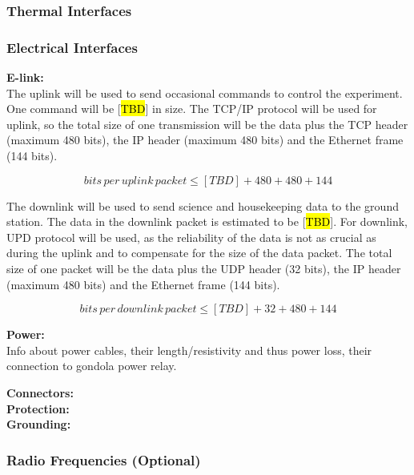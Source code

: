 % 


\subsubsection{Thermal Interfaces}
\label{sec:4.2.2}


\subsubsection{Electrical Interfaces}
\label{sec:4.2.3}
\textbf{E-link:}\\
The uplink will be used to send occasional commands to control the experiment. One command will be [\hl{TBD}] in size. The TCP/IP protocol will be used for uplink, so the total size of one transmission will be the data plus the TCP header (maximum 480 bits), the IP header (maximum 480 bits) and the Ethernet frame (144 bits). 

$$ bits\, per\, uplink\, packet \leq [TBD] + 480 + 480 + 144 $$

The downlink will be used to send science and housekeeping data to the ground station. The data in the downlink packet is estimated to be [\hl{TBD}]. For downlink, UPD protocol will be used, as the reliability of the data is not as crucial as during the uplink and to compensate for the size of the data packet. The total size of one packet will be the data plus the UDP header (32 bits), the IP header (maximum 480 bits) and the Ethernet frame (144 bits).

$$ bits\, per\, downlink\, packet \leq [TBD] + 32 + 480 + 144 $$

\textbf{Power:}\\
Info about power cables, their length/resistivity and thus power loss, their connection to gondola power relay.


\textbf{Connectors:}\\

\textbf{Protection:}\\

\textbf{Grounding:}\\


\subsubsection{Radio Frequencies (Optional)}



\raggedbottom
